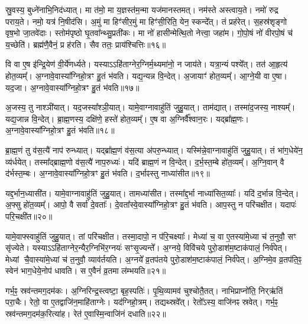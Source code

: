 स्रु॒वस्य॒ बुध्ने॑नाभि॒निद॑ध्यात्।
मा त॑मो॒ मा य॒ज्ञस्त॑म॒न्मा यज॑मानस्तमत्।
नम॑स्ते अस्त्वाय॒ते।
नमो॑ रुद्र पराय॒ते।
नमो॒ यत्र॑ नि॒षीद॑सि।
अ॒मुं मा हिꣳ॑सीर॒मुं मा हिꣳ॑सी॒रिति॒ येन॒ स्कन्दे᳚त्।
तं प्रह॑रेत्।
स॒हस्र॑शृङ्गो वृष॒भो जा॒तवे॑दाः।
स्तोम॑पृष्ठो घृ॒तवा᳚न्थ्सु॒प्रती॑कः।
मा नो॑ हासीन्मेत्थि॒तो नेत्त्वा॒ जहा॑म।
गो॒पो॒षं नो॑ वीरपो॒षं च॑ य॒च्छेति॑।
ब्रह्म॑णै॒वैनं॒ प्र ह॑रति।
सैव ततः॒ प्राय॑श्चित्तिः॥१६॥\ip{}

वि वा ए॒ष इ॑न्द्रि॒येण॑ वी॒र्ये॑णर्ध्यते।
यस्याऽऽहि॑ताग्ने\-र॒ग्निर्म॒थ्य\-मा॑नो॒ न जाय॑ते।
यत्रा॒न्यं पश्ये᳚त्।
तत॑ आ॒हृत्य॑ होत॒व्यम्᳚।
अ॒ग्नावे॒वास्या᳚ग्निहो॒त्रꣳ हु॒तं भ॑वति।
यद्य॒न्यन्न वि॒न्देत्।
अ॒जायाꣳ॑ होत॒व्यम्᳚।
आ॒ग्ने॒यी वा ए॒षा।
यद॒जा।
अ॒ग्नावे॒वास्या᳚ग्निहो॒त्रꣳ हु॒तं भ॑वति॥१७॥\ip

अ॒जस्य॒ तु नाश्ञी॑यात्।
यद॒जस्या᳚श्ञी॒यात्।
यामे॒वाग्नावाहु॑तिं जुहु॒यात्।
ताम॑द्यात्।
तस्मा॑द॒जस्य॒ नाश्यम्᳚।
यद्य॒जान्न वि॒न्देत्।
ब्रा॒ह्म॒णस्य॒ दक्षि॑णे॒ हस्ते॑ होत॒व्यम्᳚।
ए॒ष वा अ॒ग्निर्वै᳚श्वान॒रः।
यद्ब्रा᳚ह्म॒णः।
अ॒ग्नावे॒वास्या᳚ग्निहो॒त्रꣳ हु॒तं भ॑वति॥१८॥\ip

ब्रा॒ह्म॒णं तु व॑स॒त्यै॑ नाप॑ रुन्ध्यात्।
यद्ब्रा᳚ह्म॒णं व॑स॒त्या अ॑परु॒न्ध्यात्।
यस्मि॑न्ने॒वाग्नावाहु॑तिं जुहु॒यात्।
तं भा॑ग॒धेये॑न॒ व्य॑र्धयेत्।
तस्मा᳚द्ब्राह्म॒णो व॑स॒त्यै॑ नाप॒रुध्यः॑।
यदि॑ ब्राह्म॒णं न वि॒न्देत्।
द॒र्भ॒स्त॒म्बे हो॑त॒व्यम्᳚।
अ॒ग्नि॒वान् वै द॑र्भस्त॒म्बः।
अ॒ग्नावे॒वास्या᳚ग्निहो॒त्रꣳ हु॒तं भ॑वति।
द॒र्भाꣴस्तु नाध्या॑सीत॥१९॥\ip

यद्द॒र्भान॒ध्यासी॑त।
यामे॒वाग्नावाहु॑तिं जुहु॒यात्।
तामध्या॑सीत।
तस्मा᳚द्द॒र्भा नाध्या॑सित॒व्याः᳚।
यदि॑ द॒र्भान्न वि॒न्देत्।
अ॒फ्सु हो॑त॒व्यम्᳚।
आपो॒ वै सर्वा॑ दे॒वताः᳚।
दे॒वता᳚स्वे॒वास्या᳚ग्निहो॒त्रꣳ हु॒तं भ॑वति।
आप॒स्तु न परि॑चक्षीत।
यदापः॑ परि॒चक्षी॑त॥२०॥\ip

यामे॒वाफ्स्वाहु॑तिं जुहु॒यात्।
तां परि॑चक्षीत।
तस्मा॒दापो॒ न प॑रि॒चक्ष्याः᳚।
मेध्या॑ च॒ वा ए॒तस्या॑मे॒ध्या च॑ त॒नुवौ॒ सꣳ सृ॑ज्येते।
यस्याऽऽहि॑ताग्नेर॒न्यैर॒ग्निभि॑र॒ग्नयः॑ सꣳसृ॒ज्यन्ते᳚।
अ॒ग्नये॒ विवि॑चये पुरो॒डाश॑म॒ष्टा\-क॑पालं॒ निर्व॑पेत्।
मेध्यां चै॒वास्या॑मे॒ध्यां च॑ त॒नुवौ॒ व्याव॑र्तयति।
अ॒ग्नये᳚ व्र॒तप॑तये पुरो॒डाश॑म॒ष्टा\-क॑पालं॒ निर्व॑पेत्।
अ॒ग्निमे॒व व्र॒तप॑ति॒ꣴ॒ स्वेन॑ भाग॒धेये॒नोप॑ धावति।
स ए॒वैनं॑ व्र॒तमा ल॑म्भयति॥२१॥\ip

गर्भ॒ꣴ॒ स्रव॑न्तमग॒दम॑कः।
अ॒ग्निरिन्द्र॒स्त्वष्टा॒ बृह॒स्पतिः॑।
पृ॒थि॒व्यामव॑ चुश्चोतै॒तत्।
नाभि\-प्राप्नो॑ति॒ निर्‌\mbox{}ऋ॑तिं परा॒चैः।
रेतो॒ वा ए॒तद्वाजि॑न॒माहि॑ताग्नेः।
यद॑ग्निहो॒त्रम्।
तद्यथ्स्रवे᳚त्।
रेतो᳚\-ऽस्य॒ वाजि॑नꣴ स्रवेत्।
गर्भ॒ꣴ॒ स्रव॑न्तमग॒दम॑क॒रित्या॑ह।
रेत॑ ए॒वास्मि॒न्वाजि॑नं दधाति॥२२॥\ip

